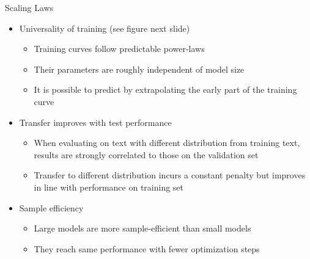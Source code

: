 \begin{vbframe}{Scaling Laws}

\vfill

\begin{itemize}

	\item Universality of training (see figure next
	slide) \qmark
	\begin{itemize}
	\item Training curves follow predictable power-laws
	\item Their parameters are roughly independent of model size
	\item It is possible to predict by extrapolating the early part of the training curve
	\end{itemize}

	\item Transfer improves with test performance \qmark
	\begin{itemize}
	\item When evaluating on text with different distribution from training text, results are strongly correlated to those on the validation set
	\item Transfer to different distribution incurs a constant penalty but improves in line with performance on training set
	\end{itemize}

	\item Sample efficiency \qmark
	\begin{itemize}
	\item Large models are more sample-efficient than small models
	\item They reach same performance with fewer optimization steps
	\end{itemize}

\end{itemize}

\vfill

\end{vbframe}


